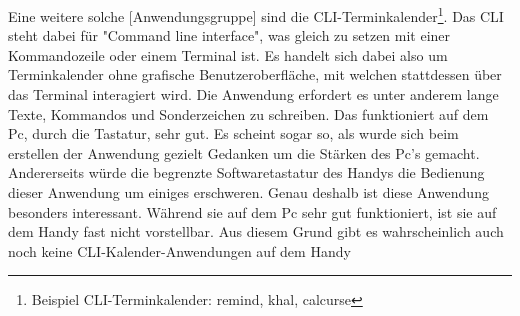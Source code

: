 \myNewSection
Eine weitere solche [Anwendungsgruppe] sind die CLI-Terminkalender\footnote{Beispiel CLI-Terminkalender: remind\cite{cli_remind}, khal\cite{cli_khal}, calcurse\cite{cli_calcurse}}. Das CLI steht dabei für "Command line interface", was gleich zu setzen mit einer Kommandozeile oder einem Terminal ist. Es handelt sich dabei also um Terminkalender ohne grafische Benutzeroberfläche, mit welchen stattdessen über das Terminal interagiert wird. Die Anwendung erfordert es unter anderem lange Texte, Kommandos und Sonderzeichen zu schreiben. Das funktioniert auf dem Pc, durch die Tastatur, sehr gut. Es scheint sogar so, als wurde sich beim erstellen der Anwendung gezielt Gedanken um die Stärken des Pc's gemacht. Andererseits würde die begrenzte Softwaretastatur des Handys die Bedienung dieser Anwendung um einiges erschweren. Genau deshalb ist diese Anwendung besonders interessant. Während sie auf dem Pc sehr gut funktioniert, ist sie auf dem Handy fast nicht vorstellbar. Aus diesem Grund gibt es wahrscheinlich auch noch keine CLI-Kalender-Anwendungen auf dem Handy\newline%





